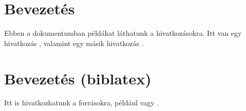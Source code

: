 \documentclass{article}
\begin{document}
\section{Bevezetés}
Ebben a dokumentumban példákat láthatunk a hivatkozásokra. Itt van egy hivatkozás \cite{knuth84}, valamint egy másik hivatkozás \cite{lamport94}.

\printbibliography

\newpage %

\usepackage[backend=biber, style=authoryear]{biblatex} %

\section{Bevezetés (biblatex)}
Itt is hivatkozhatunk a forrásokra, például \cite{abrharber03} vagy \cite{bujfaz}.

\printbibliography
\end{document}
